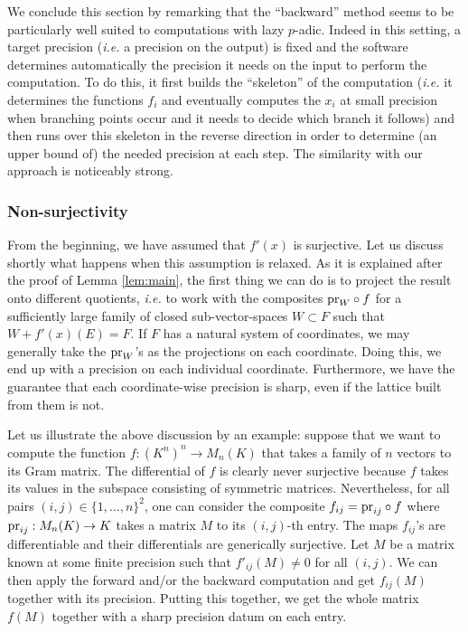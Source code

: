 \documentclass{lms}
\begin{document}
We conclude this section by remarking that the ``backward'' method seems 
to be particularly well suited to computations with lazy $p$-adic. Indeed 
in this setting, a target precision (\emph{i.e.} a precision on the 
output) is fixed and the software determines automatically the precision 
it needs on the input to perform the computation. To do this, it first 
builds the ``skeleton'' of the computation (\emph{i.e.} it determines the 
functions $f_i$ and eventually computes the $x_i$ at small precision when 
branching points occur and it needs to decide which branch it follows) 
and then runs over this skeleton in the reverse direction in order to 
determine (an upper bound of) the needed precision at each step. The 
similarity with our approach is noticeably strong.

\subsubsection*{Non-surjectivity}

From the beginning, we have assumed that $f'(x)$ is surjective. Let us 
discuss shortly what happens when this assumption is relaxed. As it is 
explained after the proof of Lemma \ref{lem:main}, the first thing we 
can do is to project the result onto different quotients, \emph{i.e.} to 
work with the composites $\text{\rm pr}_W \circ f$ for a sufficiently large family 
of closed sub-vector-spaces $W \subset F$ such that $W + f'(x)(E) = F$. 
If $F$ has a natural system of coordinates, we may generally take the 
$\text{\rm pr}_W$'s as the projections on each coordinate. Doing this, we end up 
with a precision on each individual coordinate. Furthermore, we have the 
guarantee that each coordinate-wise precision is sharp, even if the lattice built
from them is not.

Let us illustrate the above discussion by an example: suppose that we 
want to compute the function $f : (K^n)^n \to M_n(K)$ that takes a 
family of $n$ vectors to its Gram matrix. The differential of $f$ is
clearly never surjective because $f$ takes its values in the subspace
consisting of symmetric matrices. Nevertheless, for all pairs $(i,j)
\in \{1, \ldots, n\}^2$, one can consider the composite $f_{ij} = 
\text{\rm pr}_{ij} \circ f$ where $\text{\rm pr}_{ij} : M_n(K) \to K$ takes a matrix 
$M$ to its $(i,j)$-th entry. The maps $f_{ij}$'s are differentiable and 
their differentials are generically surjective. Let $M$ be a matrix known
at some finite precision such that 
$f'_{ij} (M) \neq 0$ for all $(i,j)$. We can then apply the forward 
and/or the backward computation and get $f_{ij}(M)$ together with its 
precision. Putting this together, we get the whole matrix $f(M)$ 
together with a sharp precision datum on each entry.
\end{document}
